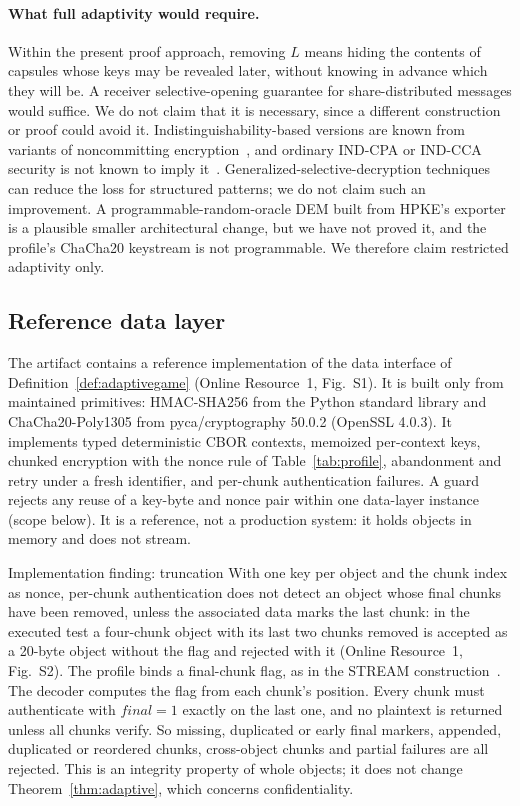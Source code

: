 \documentclass[pdflatex,sn-mathphys-num]{sn-jnl}%
\theoremstyle{plain}
\theoremstyle{definition}
\begin{document}
\paragraph{What full adaptivity would require.}
Within the present proof approach, removing $L$ means hiding the contents of capsules whose keys may be revealed later, without knowing in advance which they will be. A receiver selective-opening guarantee for share-distributed messages would suffice. We do not claim that it is necessary, since a different construction or proof could avoid it. Indistinguishability-based versions are known from variants of noncommitting encryption~\cite{hazay2015,canetti1996}, and ordinary IND-CPA or IND-CCA security is not known to imply it~\cite{bellare2009}. Generalized-selective-decryption techniques~\cite{panjwani2007,jafargholi2017} can reduce the loss for structured patterns; we do not claim such an improvement. A programmable-random-oracle DEM built from HPKE's exporter is a plausible smaller architectural change, but we have not proved it, and the profile's ChaCha20 keystream is not programmable. We therefore claim restricted adaptivity only.

\subsection{Reference data layer}\label{sec:datalayer}
The artifact contains a reference implementation of the data interface of Definition~\ref{def:adaptivegame} (Online Resource~1, Fig.~S1). It is built only from maintained primitives: HMAC-SHA256 from the Python standard library and ChaCha20-Poly1305 from pyca/cryptography 50.0.2 (OpenSSL 4.0.3). It implements typed deterministic CBOR contexts, memoized per-context keys, chunked encryption with the nonce rule of Table~\ref{tab:profile}, abandonment and retry under a fresh identifier, and per-chunk authentication failures. A guard rejects any reuse of a key-byte and nonce pair within one data-layer instance (scope below). It is a reference, not a production system: it holds objects in memory and does not stream.


\begin{implbox}{Implementation finding: truncation}
With one key per object and the chunk index as nonce, per-chunk authentication does not detect an object whose final chunks have been removed, unless the associated data marks the last chunk: in the executed test a four-chunk object with its last two chunks removed is accepted as a 20-byte object without the flag and rejected with it (Online Resource~1, Fig.~S2). The profile binds a final-chunk flag, as in the STREAM construction~\cite{hoang2015}. The decoder computes the flag from each chunk's position. Every chunk must authenticate with $\mathit{final}=1$ exactly on the last one, and no plaintext is returned unless all chunks verify. So missing, duplicated or early final markers, appended, duplicated or reordered chunks, cross-object chunks and partial failures are all rejected. This is an integrity property of whole objects; it does not change Theorem~\ref{thm:adaptive}, which concerns confidentiality.
\end{implbox}
\end{document}
